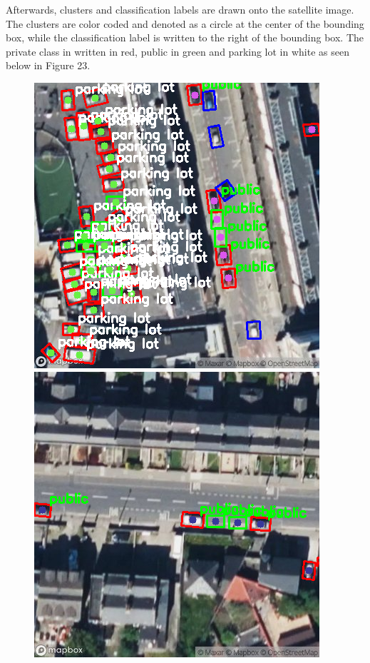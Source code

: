 Afterwards, clusters and classification labels are drawn onto the satellite
image. The clusters are color coded and denoted as a circle at the center of the
bounding box, while the classification label is written to the right of the
bounding box. The private class in written in red, public in green and parking
lot in white as seen below in Figure 23.

\begin{figure}[htbp]
  \centering
  \begin{minipage}{0.45\textwidth}
    \centering
    \includegraphics[width=\textwidth]{images/classification1.png}
  \end{minipage}
  \hfill
  \begin{minipage}{0.45\textwidth}
    \centering
    \includegraphics[width=\textwidth]{images/classification2.png}

\end{minipage}
\end{figure}
